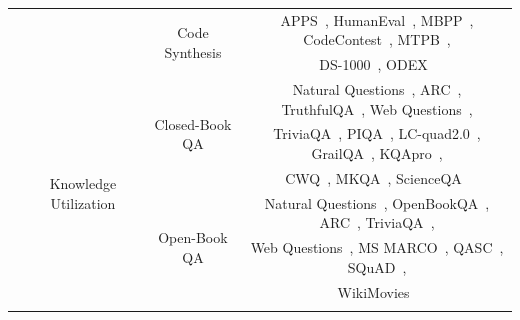 \begin{table}[htbp]
\begin{tabular}{cccc}
                                                 \addlinespace
                                             &   &\multirow{2}{*}{Code Synthesis}                & APPS~\cite{Hendrycks-nips-2021-Measuring}, HumanEval~\cite{Chen-arxiv-2021-evaluating}, MBPP~\cite{Austin-arxiv-2021-Program}, CodeContest~\cite{Li-Science-2022-AlphaCode},
                                                MTPB~\cite{nijkamp-arxiv-2022-Codegen},
                                                \\ 
                                             &   &   &
                                                DS-1000~\cite{Lai-arxiv-2022-DS}, ODEX~\cite{Wang-arxiv-2022-Execution} \\
                                                \cmidrule(r){2-4}
        &\multirow{9}{*}{Knowledge Utilization}  
            &\multirow{3}{*}{Closed-Book QA}                &  
                Natural Questions~\cite{Kwiatkowski-ACL-2019-Natural}, 
                ARC~\cite{Clark-arxiv-2018-Think},  
                TruthfulQA~\cite{Lin-ACL-2022-TruthfulQA}, 
                Web Questions~\cite{Berant-EMNLP-2013-Semantic},\\
          &  &           & 
                TriviaQA~\cite{Joshi-ACL-2017-TriviaQA}, 
                PIQA~\cite{Bisk-AAAI-2020-PIQA}, 
                LC-quad2.0~\cite{Dubey-ISWC-2019-LC}, 
                GrailQA~\cite{Gu-WWW-2021-Beyond}, 
                KQApro~\cite{Cao-ACL-2022-KQA},\\ 
          &  &           &
                CWQ~\cite{Hu-COLING-2022-Logical}, 
                MKQA~\cite{Longpre-TACL-2021-MKQA}, 
                ScienceQA~\cite{Saikh-IJDL-2022-ScienceQA} \\
            \addlinespace
         &   &\multirow{3}{*}{Open-Book QA}                  &  
                Natural Questions~\cite{Kwiatkowski-ACL-2019-Natural}, 
                OpenBookQA~\cite{Mihaylov-EMNLP-2018-Can}, 
                ARC~\cite{Clark-arxiv-2018-Think}, 
                TriviaQA~\cite{Joshi-ACL-2017-TriviaQA}, \\
          &  &           &  
                 Web Questions~\cite{Berant-EMNLP-2013-Semantic},
                MS MARCO~\cite{Nguyen-NIPS-2016-MS}, 
                QASC~\cite{Khot-AAAI-2020-QASC}, 
                SQuAD~\cite{Rajpurkar-EMNLP-2016-SQuAD}, 
                \\
        &  &           &  
                WikiMovies~\cite{Miller-EMNLP-2016-Key} \\
            \addlinespace

\end{tabular}
\end{table}
